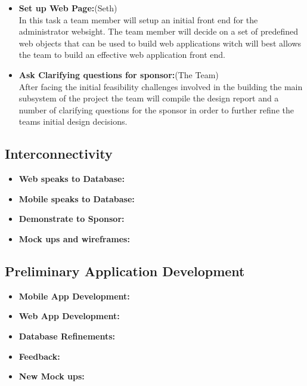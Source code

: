 \documentclass[Letter,11pt]{article}
\begin{document}
\begin{itemize}
			\item\textbf{Set up Web Page:}(Seth)\\
			In this task a team member will setup an initial front end for the administrator websight. The team member will decide on a set of predefined web objects that can be used to build web applications witch will best allows the team to build an effective web application front end. 
			
			\item\textbf{Ask Clarifying questions for sponsor:}(The Team)\\
			After facing the initial feasibility challenges involved in the building the main subsystem of the project the team will compile the design report and a number of clarifying questions for the sponsor in order to further refine the teams initial design decisions. 
		\end{itemize}
		
		
		
	\subsection{Interconnectivity}\label{connect}
		
		\begin{itemize}
			\item\textbf{Web speaks to Database:}\\
			
			\item \textbf{Mobile speaks to Database:}\\
			
			\item\textbf{Demonstrate to Sponsor:}\\
			
			\item\textbf{Mock ups and wireframes:}\\
			
		\end{itemize}
		
		\subsection{Preliminary Application Development}\label{dev1}
		
		\begin{itemize}
			\item\textbf{Mobile App Development:}\\
			
			\item \textbf{Web App Development:}\\
			
			\item\textbf{Database Refinements:}\\
			
			\item\textbf{Feedback:}\\
			
			\item\textbf{New Mock ups:}\\
			
		\end{itemize}
		
\end{document}
